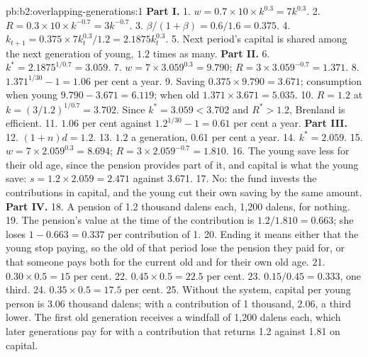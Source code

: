 \begin{solution}{pb:b2:overlapping-generations:1}
\textbf{Part I.}
1. $w = 0.7 \times 10 \times k^{0.3} = 7k^{0.3}$.
2. $R = 0.3 \times 10 \times k^{-0.7} = 3k^{-0.7}$.
3. $\beta/(1 + \beta) = 0.6/1.6 = 0.375$.
4. $k_{t+1} = 0.375 \times 7k_t^{0.3}/1.2 = 2.1875k_t^{0.3}$.
5. Next period's capital is shared among the next generation of young, $1.2$ times as many.
\textbf{Part II.}
6. $k^* = 2.1875^{1/0.7} = 3.059$.
7. $w = 7 \times 3.059^{0.3} = 9.790$; $R = 3 \times 3.059^{-0.7} = 1.371$.
8. $1.371^{1/30} - 1 = 1.06$ per cent a year.
9. Saving $0.375 \times 9.790 = 3.671$; consumption when young $9.790 - 3.671 = 6.119$; when old $1.371 \times 3.671 = 5.035$.
10. $R = 1.2$ at $k = (3/1.2)^{1/0.7} = 3.702$. Since $k^* = 3.059 < 3.702$ and $R^* > 1.2$, Brenland is efficient.
11. $1.06$ per cent against $1.2^{1/30} - 1 = 0.61$ per cent a year.
\textbf{Part III.}
12. $(1 + n)d = 1.2$.
13. $1.2$ a generation, 0.61 per cent a year.
14. $k^* = 2.059$.
15. $w = 7 \times 2.059^{0.3} = 8.694$; $R = 3 \times 2.059^{-0.7} = 1.810$.
16. The young save less for their old age, since the pension provides part of it, and capital is what the young save:
$s = 1.2 \times 2.059 = 2.471$ against 3.671.
17. No: the fund invests the contributions in capital, and the young cut their own saving by the same amount.
\textbf{Part IV.}
18. A pension of 1.2 thousand dalens each, 1,200 dalens, for nothing.
19. The pension's value at the time of the contribution is $1.2/1.810 = 0.663$; she loses $1 - 0.663 = 0.337$ per contribution of 1.
20. Ending it means either that the young stop paying, so the old of that period lose the pension they paid for, or that
someone pays both for the current old and for their own old age.
21. $0.30 \times 0.5 = 15$ per cent.
22. $0.45 \times 0.5 = 22.5$ per cent.
23. $0.15/0.45 = 0.333$, one third.
24. $0.35 \times 0.5 = 17.5$ per cent.
25. Without the system, capital per young person is 3.06 thousand dalens; with a contribution of 1 thousand, 2.06, a third lower. The
first old generation receives a windfall of 1,200 dalens each, which later generations pay for with a contribution that
returns 1.2 against 1.81 on capital.
\end{solution}
